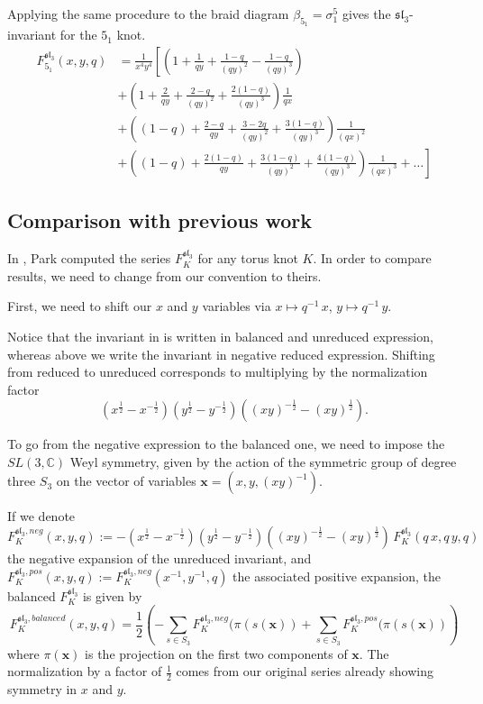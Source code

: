 \documentclass[12pt,oneside,reqno]{amsart}
\def\C{\mathbb{C}}
\numberwithin{teorema}{section}
\numberwithin{definicion}{section}
\numberwithin{lema}{section}
\numberwithin{conjetura}{section}
\numberwithin{proposicion}{section}
\def\sl{\mathfrak{sl}}
\begin{document}
Applying the same procedure to the braid diagram $\beta_{5_1}=\sigma_1^5$ gives the $\sl_3$-invariant for the $5_1$ knot.
\begin{equation}\label{eq:cinquefoil}
\begin{split}
    F_{5_1}^{\sl_3}(x,y,q)&= \frac{1}{x^4y^4}\left[\left(1+\frac{1}{qy}+\frac{1-q}{(qy)^2}-\frac{1-q}{(qy)^3}\right)\right.
    \\&+\left(1+\frac{2}{qy}+\frac{2-q}{(qy)^2}+\frac{2(1-q)}{(qy)^3}\right)\frac{1}{qx}
    \\&+\left((1-q)+\frac{2-q}{qy}+\frac{3-2 q}{(qy)^2}+\frac{3(1-q)}{(qy)^3}\right)\frac{1}{(qx)^2}
    \\&+\left.\left((1-q)+\frac{2(1-q)}{qy}+\frac{3(1-q)}{(qy)^2}+\frac{4(1-q)}{(qy)^3}\right)\frac{1}{(qx)^3}+\dots\right]
\end{split}
\end{equation}

\subsection{Comparison with previous work}

In \cite{Park20}, Park computed the series $F_K^{\sl_3}$ for any torus knot $K$. In order to compare results, we need to change from our convention to theirs.

First, we need to shift our $x$ and $y$ variables via $x\mapsto q^{-1}\,x$, $y\mapsto q^{-1}\,y$.

Notice that the invariant in \cite{Park20} is written in balanced and unreduced expression, whereas above we write the invariant in negative reduced expression.  Shifting from reduced to unreduced corresponds to multiplying by the normalization factor
\begin{equation*}
   (x^{\frac12}- x^{-\frac12})(y^\frac12 - y^{-\frac12})((xy)^{-\frac12} - (xy)^{\frac12}).
\end{equation*}

To go from the negative expression to the balanced one, we need to impose the $SL(3,\C)$ Weyl symmetry, given by the action of the symmetric group of degree three $S_3$ on the vector of variables $\textbf{x}=(x,y,(xy)^{-1})$.

If we denote 
\begin{equation}
    F_K^{\sl_3,neg}(x,y,q):=-(x^{\frac12}- x^{-\frac12})(y^\frac12 - y^{-\frac12})((xy)^{-\frac12} - (xy)^{\frac12}) \, F_K^{\sl_3}(q\,x,q\,y,q)
\end{equation}
the negative expansion of the unreduced invariant, and $F_K^{\sl_3,pos}(x,y,q):=F_K^{\sl_3,neg}(x^{-1},y^{-1},q)$ the associated positive expansion, the balanced $F_K^{\sl_3}$ is given by
\begin{equation}
    F_K^{\sl_3,balanced}(x,y,q)=\frac{1}{2}\left(-\sum_{s\in S_3} F_K^{\sl_3,neg}(\pi(s(\textbf{x})) + \sum_{s\in S_3} F_K^{\sl_3,pos}(\pi(s(\textbf{x}))\right)
\end{equation}
where $\pi(\textbf{x})$ is the projection on the first two components of $\textbf{x}$. The normalization by a factor of $\frac12$ comes from our original series already showing symmetry in $x$ and $y$.
\end{document}
